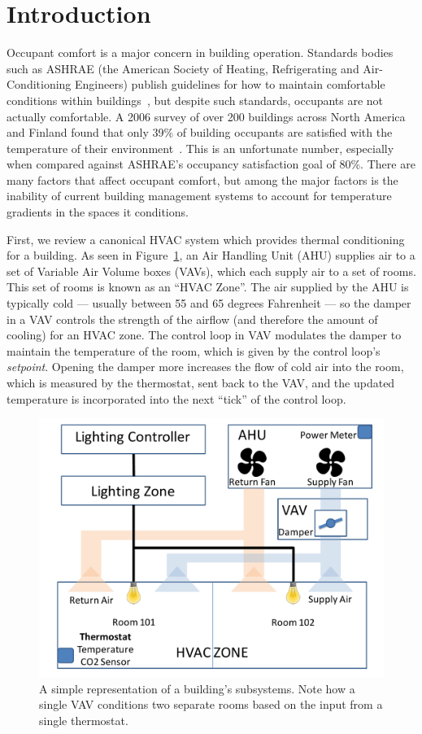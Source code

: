 \section{Introduction}



Occupant comfort is a major concern in building operation.
Standards bodies such as ASHRAE (the American Society of Heating, Refrigerating and Air-Conditioning Engineers) publish guidelines for how to maintain comfortable conditions within buildings~\cite{givoni1992comfort}, but despite such standards, occupants are not actually comfortable.
A 2006 survey of over 200 buildings across North America and Finland found that only 39\% of building occupants are satisfied with the temperature of their environment~\cite{huizenga2006air}.
This is an unfortunate number, especially when compared against ASHRAE's occupancy satisfaction goal of 80\%.
There are many factors that affect occupant comfort, but among the major factors is the inability of current building management systems to account for temperature gradients in the spaces it conditions.

First, we review a canonical HVAC system which provides thermal conditioning for a building.
As seen in Figure~\ref{fig:example_building}, an Air Handling Unit (AHU) supplies air to a set of Variable Air Volume boxes (VAVs), which each supply air to a set of rooms.
This set of rooms is known as an ``HVAC Zone''.
The air supplied by the AHU is typically cold --- usually between 55 and 65 degrees Fahrenheit --- so the damper in a VAV controls the strength of the airflow (and therefore the amount of cooling) for an HVAC zone.
The control loop in VAV modulates the damper to maintain the temperature of the room, which is given by the control loop's \emph{setpoint}. 
Opening the damper more increases the flow of cold air into the room, which is measured by the thermostat, sent back to the VAV, and the updated temperature is incorporated into the next ``tick'' of the control loop.

\begin{figure}[!hb]
\centering
\includegraphics[width=.5\linewidth]{figs/example_building}
\caption{A simple representation of a building's subsystems. Note how a single VAV conditions two separate rooms based on the input from a single thermostat.}
\label{fig:example_building}
\end{figure}

